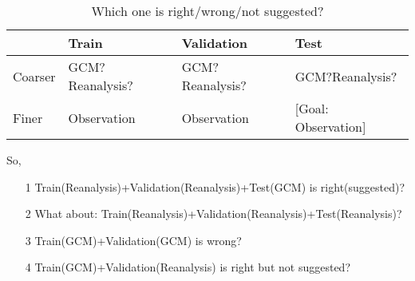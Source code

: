 \documentclass[10pt]{article}
\begin{document}
\begin{table}[]
\centering
\caption{Which one is right/wrong/not suggested?}
\label{my-label2}
\begin{tabular}{|l|l|l|l|}
\hline
       & Train           & Validation      & Test            \\ \hline
Coarser & GCM?Reanalysis? & GCM?Reanalysis? & GCM?Reanalysis? \\ \hline
Finer   & Observation     & Observation     & [Goal: Observation]     \\ \hline
\end{tabular}
\end{table}


So,
\begin{itemize}
\item[1] Train(Reanalysis)+Validation(Reanalysis)+Test(GCM) is right(suggested)?
\item[2] What about: Train(Reanalysis)+Validation(Reanalysis)+Test(Reanalysis)?
\item[3] Train(GCM)+Validation(GCM) is wrong?
\item[4] Train(GCM)+Validation(Reanalysis) is right but not suggested?
\end{itemize}
\end{document}
